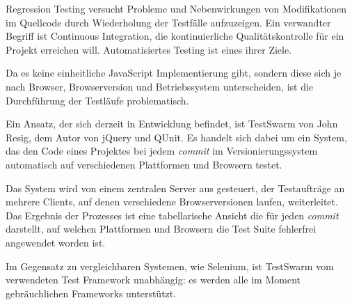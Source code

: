 \documentclass[11pt, a4paper]{article}
\begin{document}
Regression Testing\cite{wikipedia_regression_2011} versucht Probleme und
Nebenwirkungen von Modifikationen im Quellcode durch Wiederholung der Testfälle
aufzuzeigen. Ein verwandter Begriff ist Continuous
Integration\cite{wikipedia_continuous_2011}, die kontinuierliche
Qualitätskontrolle für ein Projekt erreichen will. Automatisiertes Testing ist
eines ihrer Ziele. 

Da es keine einheitliche JavaScript Implementierung gibt, sondern
diese sich je nach Browser, Browserversion und Betriebssystem unterscheiden, ist
die Durchführung der Testläufe problematisch.

Ein Ansatz, der sich derzeit in Entwicklung befindet, ist
TestSwarm\cite{resig_testswarm_2011} von John Resig, dem Autor von jQuery und
QUnit. Es handelt sich dabei um ein System, das den Code eines Projektes bei
jedem \emph{commit} im Versionierungssystem automatisch auf verschiedenen
Plattformen und Browsern testet.

Das System wird von einem zentralen Server aus gesteuert, der Testaufträge an
mehrere Clients, auf denen verschiedene Browserversionen laufen, weiterleitet.
Das Ergebnis der Prozesses ist eine tabellarische Ansicht die für jeden
\emph{commit} darstellt, auf welchen Plattformen und Browsern die Test Suite
fehlerfrei angewendet worden ist.

Im Gegensatz zu vergleichbaren Systemen, wie
Selenium\cite{selenium_selenium_2011}, ist TestSwarm vom verwendeten Test
Framework unabhängig: es werden alle im Moment gebräuchlichen Frameworks
unterstützt.

\begin{flushleft}
  
  
\end{flushleft}
\end{document}
